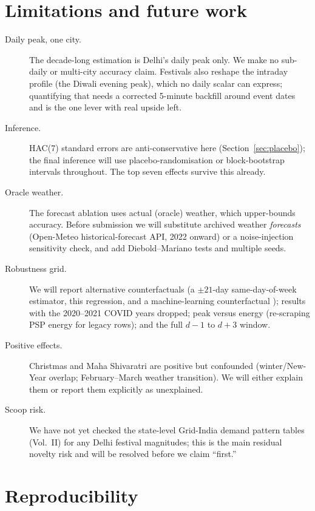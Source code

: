 \documentclass[11pt]{article}
\begin{document}
\section{Limitations and future work}
\label{sec:limits}

\begin{description}
\item[Daily peak, one city.] The decade-long estimation is Delhi's daily peak
  only. We make no sub-daily or multi-city accuracy claim. Festivals also reshape
  the intraday profile (the Diwali evening peak), which no daily scalar can
  express; quantifying that needs a corrected 5-minute backfill around event dates
  and is the one lever with real upside left.
\item[Inference.] HAC(7) standard errors are anti-conservative here
  (Section~\ref{sec:placebo}); the final inference will use
  placebo-randomisation or block-bootstrap intervals throughout. The top seven
  effects survive this already.
\item[Oracle weather.] The forecast ablation uses actual (oracle) weather, which
  upper-bounds accuracy. Before submission we will substitute archived weather
  \emph{forecasts} (Open-Meteo historical-forecast API, 2022 onward) or a
  noise-injection sensitivity check, and add Diebold--Mariano tests and multiple
  seeds.
\item[Robustness grid.] We will report alternative counterfactuals (a $\pm21$-day
  same-day-of-week estimator, this regression, and a machine-learning
  counterfactual \citep{prasanna2022,rubattu2023}); results with the 2020--2021
  COVID years dropped; peak versus energy (re-scraping PSP energy for legacy rows);
  and the full $d{-}1$ to $d{+}3$ window.
\item[Positive effects.] Christmas and Maha Shivaratri are positive but confounded
  (winter/New-Year overlap; February--March weather transition). We will either
  explain them or report them explicitly as unexplained.
\item[Scoop risk.] We have not yet checked the state-level Grid-India demand
  pattern tables (Vol.~II) for any Delhi festival magnitudes; this is the main
  residual novelty risk and will be resolved before we claim ``first.''
\end{description}

\section*{Reproducibility}
\end{document}
